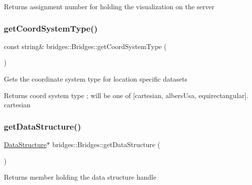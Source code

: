 \begin{DoxyReturn}{Returns}
assignment number for holding the visualization on the server 
\end{DoxyReturn}
\mbox{\label{classbridges_1_1_bridges_aac3cdb607177ff537f5160c3790d814a}} 
\subsubsection{\texorpdfstring{getCoordSystemType()}{getCoordSystemType()}}
{\footnotesize\ttfamily const string\& bridges\+::\+Bridges\+::get\+Coord\+System\+Type (\begin{DoxyParamCaption}{ }\end{DoxyParamCaption})\hspace{0.3cm}{\ttfamily [inline]}}

Gets the coordinate system type for location specific datasets

\begin{DoxyReturn}{Returns}
coord system type ; will be one of \mbox{[}\textquotesingle{}cartesian\textquotesingle{}, \textquotesingle{}albers\+Usa\textquotesingle{}, \textquotesingle{}equirectangular\textquotesingle{}\mbox{]}. \textquotesingle{}cartesian\textquotesingle{} 
\end{DoxyReturn}
\mbox{\label{classbridges_1_1_bridges_a5ddfb17c2fb2d3ca89e7564677251dea}} 
\subsubsection{\texorpdfstring{getDataStructure()}{getDataStructure()}}
{\footnotesize\ttfamily \mbox{\hyperlink{classbridges_1_1_data_structure}{Data\+Structure}}$\ast$ bridges\+::\+Bridges\+::get\+Data\+Structure (\begin{DoxyParamCaption}{ }\end{DoxyParamCaption})\hspace{0.3cm}{\ttfamily [inline]}}

\begin{DoxyReturn}{Returns}
member holding the data structure handle 
\end{DoxyReturn}
\mbox{\label{classbridges_1_1_bridges_ae9f238e1d9fc421c6c08aacb74e0ef6c}} 
